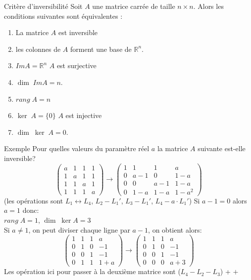  \begin{parag}{Critère d'inversibilité}
     Soit $A$ une matrice carrée de taille $n\times n $. Alors les conditions suivantes sont équivalentes : 
     \begin{enumerate}
         \item La matrice $A$ est inversible
         \item les colonnes de $A$ forment une base de $\mathbb{R}^n$.
         \item $ImA = \mathbb{R}^n$ \hspace{5cm} $A$ est surjective
         \item $\dim \; Im A = n$.
         \item $rang\; A = n$
         \item $\ker\;A = \{0\}$ \hspace{4.75cm} $A$ est injective
         \item $\dim\; \ker\; A = 0$.
     \end{enumerate}
     \begin{subparag}{Exemple}
         Pour quelles valeurs du paramètre réel $a$ la matrice $A$ suivante est-elle inversible?
         \[\begin{pmatrix}
             a & 1 & 1 & 1\\
             1 & a & 1 & 1\\
             1 & 1 & a & 1\\
             1 & 1 & 1 & a
         \end{pmatrix} \to \begin{pmatrix}
            1 & 1 & 1 & a\\
             0 & a-1 & 0 & 1-a\\
             0 & 0 & a-1 & 1-a\\
             0 & 1-a & 1-a & 1-a^2
         \end{pmatrix}\]
         (les opérations sont $L_1 \leftrightarrow L_4$, $L_2 - L_1'$, $L_3 - L_1'$, $L_4 - a\cdot L_1'$)
         Si $a - 1 = 0$ alors $a = 1$ donc:
         \\
         $rang\; A = 1$, $\dim \; \ker A = 3$
         \\
         Si $a \neq 1$, on peut diviser chaque ligne par $a-1$, on obtient alors:
 \[\begin{pmatrix}
            1 & 1 & 1 & a\\
             0 & 1 & 0 & -1\\
             0 & 0 & 1 & -1\\
             0 & 1 & 1 & 1 + a
         \end{pmatrix} \to \begin{pmatrix}
            1 & 1 & 1 & a\\
             0 & 1 & 0 & -1\\
             0 & 0 & 1 & -1\\
             0 & 0 & 0 & a + 3
         \end{pmatrix}\]
         Les opération ici pour passer à la deuxième matrice sont ($L_4 - L_2 - L_3$) + $+$
     \end{subparag}
 \end{parag}

